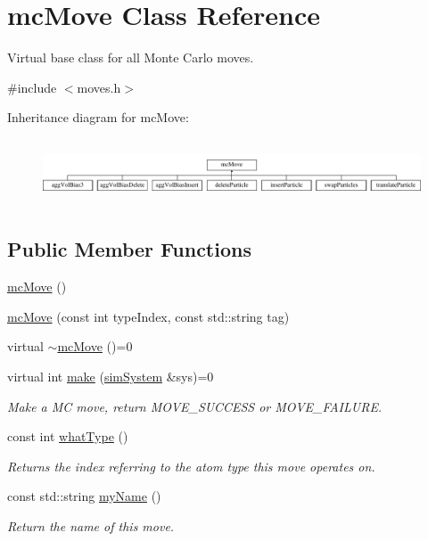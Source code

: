 \hypertarget{classmc_move}{}\section{mc\+Move Class Reference}
\label{classmc_move}


Virtual base class for all Monte Carlo moves.  




{\ttfamily \#include $<$moves.\+h$>$}

Inheritance diagram for mc\+Move\+:\begin{figure}[H]
\begin{center}
\leavevmode
\includegraphics[height=2.000000cm]{classmc_move}
\end{center}
\end{figure}
\subsection*{Public Member Functions}
\begin{DoxyCompactItemize}
\item 
\hyperlink{classmc_move_a27a375cf5fcce904dc1ba6bc315b4e1c}{mc\+Move} ()
\item 
\hyperlink{classmc_move_ab0145ba0532e4d47156e2e4565d54c3f}{mc\+Move} (const int type\+Index, const std\+::string tag)
\item 
virtual \hyperlink{classmc_move_a3d9fd30dd96eebf857fa92f734d03bbc}{$\sim$mc\+Move} ()=0
\item 
virtual int \hyperlink{classmc_move_a2e377a628f9ecee5422fc8967d4924eb}{make} (\hyperlink{classsim_system}{sim\+System} \&sys)=0
\begin{DoxyCompactList}\small\item\em Make a M\+C move, return M\+O\+V\+E\+\_\+\+S\+U\+C\+C\+E\+S\+S or M\+O\+V\+E\+\_\+\+F\+A\+I\+L\+U\+R\+E. \end{DoxyCompactList}\item 
const int \hyperlink{classmc_move_aa96ed066866a2abf8b7039fd279d0f37}{what\+Type} ()
\begin{DoxyCompactList}\small\item\em Returns the index referring to the atom type this move operates on. \end{DoxyCompactList}\item 
const std\+::string \hyperlink{classmc_move_a7b068357010f8663674a7e70a7776ccd}{my\+Name} ()
\begin{DoxyCompactList}\small\item\em Return the name of this move. \end{DoxyCompactList}\end{DoxyCompactItemize}
